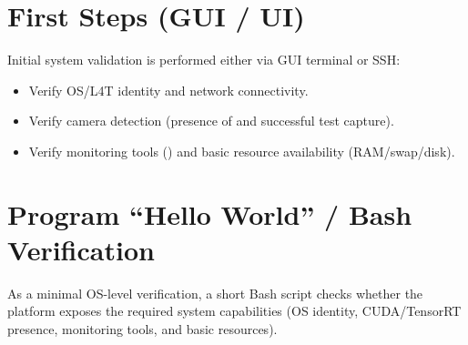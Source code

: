 \section{First Steps (GUI / UI)}
\noindent
Initial system validation is performed either via GUI terminal or SSH:
\begin{itemize}
	\item Verify OS/L4T identity and network connectivity.
	\item Verify camera detection (presence of  and successful test capture).
	\item Verify monitoring tools () and basic resource availability (RAM/swap/disk).
\end{itemize}

\section{Program ``Hello World'' / Bash Verification}
\noindent
As a minimal OS-level verification, a short Bash script checks whether the platform exposes the required system capabilities
(OS identity, CUDA/TensorRT presence, monitoring tools, and basic resources).

